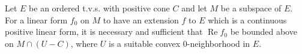 Let $E$ be an ordered t.v.s. with positive cone $C$ and let $M$ be a subspace of $E$. For a linear form $f_0$ on $M$ to have an extension $f$ to $E$ which is a continuous positive linear form, it is necessary and sufficient that $\operatorname{Re} f_0$ be bounded above on $M \cap (U - C)$, where $U$ is a suitable convex $0$-neighborhood in $E$.
